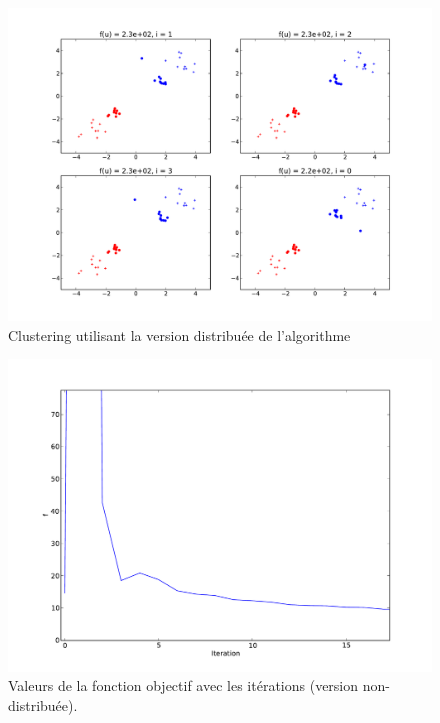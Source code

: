 \documentclass[a4paper]{article}
\begin{document}
\begin{figure}
\begin{center}
    \includegraphics[width=.9\textwidth]{figures/dda_w-bin_clust.pdf}
\end{center}
\caption{Clustering utilisant la version distribuée de l'algorithme}
\label{fig:dda_wbin_clust}
\end{figure}

\begin{figure}
\begin{center}
    \includegraphics[width=.9\textwidth]{figures/da_w-bin_f.pdf}
\end{center}
\caption{Valeurs de la fonction objectif avec les itérations (version non-distribuée).}
\label{fig:da_wbin_f}
\end{figure}
\end{document}
